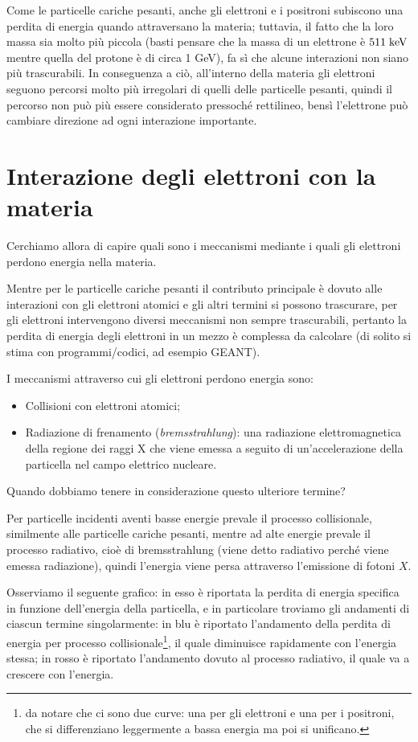 Come le particelle cariche pesanti, anche gli elettroni e i positroni subiscono una perdita di energia quando attraversano la materia; tuttavia, il fatto che la loro massa sia molto più piccola (basti pensare che la massa di un elettrone è $511 \; \rm keV$ mentre quella del protone è di circa 1 GeV), fa sì che alcune interazioni non siano più trascurabili. In conseguenza a ciò, all'interno della materia gli elettroni seguono percorsi molto più irregolari di quelli delle particelle pesanti, quindi il percorso non può più essere considerato pressoché rettilineo, bensì l'elettrone può cambiare direzione ad ogni interazione importante.

\section{Interazione degli elettroni con la materia}

Cerchiamo allora di capire quali sono i meccanismi mediante i quali gli elettroni perdono energia nella materia.

Mentre per le particelle cariche pesanti il contributo principale è dovuto alle interazioni con gli elettroni atomici e gli altri termini si possono trascurare, per gli elettroni intervengono diversi meccanismi non sempre trascurabili, pertanto la perdita di energia degli elettroni in un mezzo è complessa da calcolare (di solito si stima con programmi/codici, ad esempio GEANT).

I meccanismi attraverso cui gli elettroni perdono energia sono:

\begin{itemize}
    \item Collisioni con elettroni atomici;
    \item Radiazione di frenamento (\textit{bremsstrahlung}): una radiazione elettromagnetica della regione dei raggi X che viene emessa a seguito di un'accelerazione della particella nel campo elettrico nucleare.
\end{itemize}

Quando dobbiamo tenere in considerazione questo ulteriore termine?

Per particelle incidenti aventi basse energie prevale il processo collisionale, similmente alle particelle cariche pesanti, mentre ad alte energie prevale il processo radiativo, cioè di bremsstrahlung (viene detto radiativo perché viene emessa radiazione), quindi l'energia viene persa attraverso l'emissione di fotoni $X$.

Osserviamo il seguente grafico: in esso è riportata la perdita di energia specifica in funzione dell'energia della particella, e in particolare troviamo gli andamenti di ciascun termine singolarmente: in blu è riportato l'andamento della perdita di energia per processo collisionale\footnote{\E da notare che ci sono due curve: una per gli elettroni e una per i positroni, che si differenziano leggermente a bassa energia ma poi si unificano.}, il quale diminuisce rapidamente con l'energia stessa; in rosso è riportato l'andamento dovuto al processo radiativo, il quale va a crescere con l'energia.

